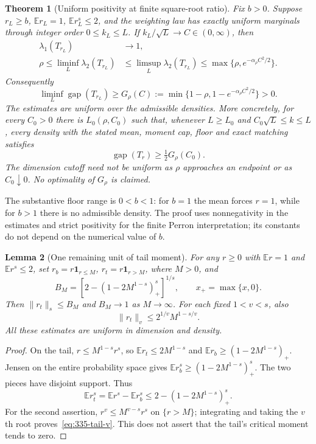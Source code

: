 \documentclass[11pt]{article}
\newtheorem{theorem}{Theorem}
\newtheorem{lemma}[theorem]{Lemma}
\newcommand{\gap}{\operatorname{gap}}
\begin{document}
\begin{theorem}[Uniform positivity at finite square-root ratio]
\label{thm:335-positive}
Fix $b>0$. Suppose $r_L\ge b$, $\mathbb E r_L=1$,
$\mathbb E r_L^s\le2$, and the weighting law has exactly uniform
marginals through integer order $0\le k_L\le L$. If
$k_L/\sqrt L\to C\in(0,\infty)$, then
\begin{align}
 \lambda_1(T_{r_L})&\longrightarrow1,\label{eq:335-first}\\
 \rho\le\liminf_L\lambda_2(T_{r_L})
 &\le\limsup_L\lambda_2(T_{r_L})
 \le\max\{\rho,e^{-\alpha_\rho C^2/2}\}.\label{eq:335-second}
\end{align}
Consequently
\begin{equation}\label{eq:335-lower-profile}
 \liminf_L\gap(T_{r_L})\ge G_\rho(C)
 :=\min\{1-\rho,1-e^{-\alpha_\rho C^2/2}\}>0.
\end{equation}
The estimates are uniform over the admissible densities. More concretely,
for every $C_0>0$ there is $L_0(\rho,C_0)$ such that, whenever
$L\ge L_0$ and $C_0\sqrt L\le k\le L$, every density with the stated
mean, moment cap, floor and exact matching satisfies
\begin{equation}\label{eq:335-finite-uniform}
 \gap(T_r)\ge\tfrac12G_\rho(C_0).
\end{equation}
The dimension cutoff need not be uniform as $\rho$ approaches an endpoint
or as $C_0\downarrow0$. No optimality of $G_\rho$ is claimed.
\end{theorem}

The substantive floor range is $0<b<1$: for $b=1$ the mean forces
$r=1$, while for $b>1$ there is no admissible density. The proof uses
nonnegativity in the estimates and strict positivity for the finite Perron
interpretation; its constants do not depend on the numerical value of $b$.

\begin{lemma}[One remaining unit of tail moment]
\label{lem:335-budget}
For any $r\ge0$ with $\mathbb E r=1$ and $\mathbb E r^s\le2$, set
$r_b=r\mathbf1_{r\le M}$, $r_t=r\mathbf1_{r>M}$, where $M>0$, and
\[
 B_M=\left[2-(1-2M^{1-s})_+^s\right]^{1/s},\qquad
 x_+=\max\{x,0\}.
\]
Then $\|r_t\|_s\le B_M$ and $B_M\to1$ as $M\to\infty$.
For each fixed $1<v<s$, also
\begin{equation}\label{eq:335-tail-v}
 \|r_t\|_v\le2^{1/v}M^{1-s/v}.
\end{equation}
All these estimates are uniform in dimension and density.
\end{lemma}
\begin{proof}
On the tail, $r\le M^{1-s}r^s$, so
$\mathbb E r_t\le2M^{1-s}$ and
$\mathbb E r_b\ge(1-2M^{1-s})_+$. Jensen on the entire probability
space gives $\mathbb E r_b^s\ge(1-2M^{1-s})_+^s$.
The two pieces have disjoint support. Thus
\[
 \mathbb E r_t^s=\mathbb E r^s-\mathbb E r_b^s
 \le2-(1-2M^{1-s})_+^s.
\]
For the second assertion, $r^v\le M^{v-s}r^s$ on $\{r>M\}$;
integrating and taking the $v$th root proves~\eqref{eq:335-tail-v}.
This does not assert that the tail's critical moment tends to zero.
\end{proof}
\end{document}
